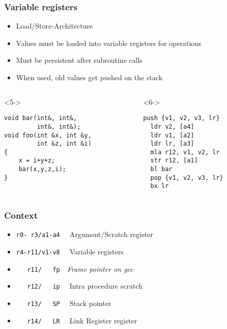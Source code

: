 \documentclass{beamer}
\begin{document}
\begin{frame}[fragile]
\frametitle{Variable registers}
\begin{itemize}
\item<1-> Load/Store-Architecture
\item<2-> Values must be loaded into variable registers for operations
\item<3-> Must be persistent after subroutine calls
\item<4-> When used, old values get pushed on the stack
\end{itemize}

\begin{columns}
\begin{column}{0.55\textwidth}
\begin{block}<5->{}
\begin{lstlisting}[basicstyle=\small]
void bar(int&, int&, 
         int&, int&);
void foo(int &x, int &y, 
         int &z, int &i)
{ 
    x = i+y+z; 
    bar(x,y,z,i); 
}\end{lstlisting}
\end{block}
\end{column}
\begin{column}{0.45\textwidth}
\begin{block}<6->{}
\begin{lstlisting}[language=ASM,basicstyle=\small]
  push {v1, v2, v3, lr}
  ldr v2, [a4]
  ldr v1, [a2]
  ldr lr, [a3]
  mla r12, v1, v2, lr
  str r12, [a1]
  bl bar
  pop {v1, v2, v3, lr}
  bx lr
\end{lstlisting}
\end{block}
\end{column}
\end{columns}

\end{frame}

\begin{frame}[fragile]
\frametitle{Context}
\begin{itemize}
\item<1-> \lstinline[columns=fixed]{r0- r3/a1-a4  } Argument/Scratch register
\item<2-> \lstinline[columns=fixed]{r4-r11/v1-v8  } Variable registers
\item<3-> \lstinline[columns=fixed]{   r11/   fp  }\textit{Frame pointer on gcc}
\item<4-> \lstinline[columns=fixed]{   r12/   ip  } Intra procedure scratch \item<5-> \lstinline[columns=fixed]{   r13/   SP  } Stack pointer
\item<6-> \lstinline[columns=fixed]{   r14/   LR  } Link Register
register

\end{itemize}

\end{frame}
\end{document}
